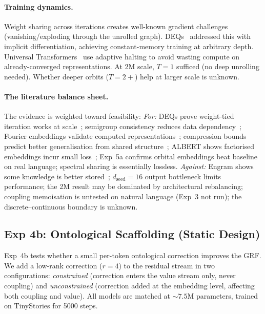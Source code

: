 \documentclass[11pt, a4paper]{article}
\theoremstyle{remark}
\begin{document}
\paragraph{Training dynamics.}
Weight sharing across iterations creates well-known gradient challenges (vanishing/exploding through the unrolled graph).
DEQs~\cite{bai2019deep} addressed this with implicit differentiation, achieving constant-memory training at arbitrary depth.
Universal Transformers~\cite{dehghani2018universal} use adaptive halting to avoid wasting compute on already-converged representations.
At 2M scale, $T{=}1$ sufficed (no deep unrolling needed). Whether deeper orbits ($T{=}2{+}$) help at larger scale is unknown.

\paragraph{The literature balance sheet.}
The evidence is weighted toward feasibility:
\textit{For:} DEQs prove weight-tied iteration works at scale~\cite{bai2019deep}; semigroup consistency reduces data dependency~\cite{chen2023deeposg}; Fourier embeddings validate computed representations~\cite{fourier2025embeddings}; compression bounds predict better generalisation from shared structure~\cite{lotfi2024compression, shaw2026kolmogorov}; ALBERT shows factorised embeddings incur small loss~\cite{lan2020albert}; Exp~5a confirms orbital embeddings beat baseline on real language; spectral sharing is essentially lossless.
\textit{Against:} Engram shows some knowledge is better stored~\cite{engram2026}; $d_{\text{seed}}{=}16$ output bottleneck limits performance; the 2M result may be dominated by architectural rebalancing; coupling memoisation is untested on natural language (Exp~3 not run); the discrete--continuous boundary is unknown.

\subsection{Exp 4b: Ontological Scaffolding (Static Design)}

Exp~4b tests whether a small per-token ontological correction improves the GRF.
We add a low-rank correction ($r{=}4$) to the residual stream in two configurations:
\emph{constrained} (correction enters the value stream only, never coupling) and
\emph{unconstrained} (correction added at the embedding level, affecting both coupling and value).
All models are matched at ${\sim}7.5$M parameters, trained on TinyStories for 5000 steps.
\end{document}
